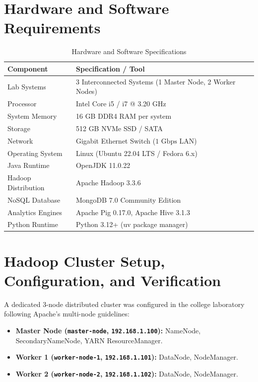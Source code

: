 \documentclass[12pt,a4paper]{article}
\begin{document}
\section{Hardware and Software Requirements}

\begin{table}[H]
\centering
\small
\begin{tabular}{ll}
\toprule
\textbf{Component} & \textbf{Specification / Tool} \\
\midrule
Lab Systems & 3 Interconnected Systems (1 Master Node, 2 Worker Nodes) \\
Processor & Intel Core i5 / i7 @ 3.20 GHz \\
System Memory & 16 GB DDR4 RAM per system \\
Storage & 512 GB NVMe SSD / SATA \\
Network & Gigabit Ethernet Switch ($1\text{ Gbps}$ LAN) \\
Operating System & Linux (Ubuntu 22.04 LTS / Fedora 6.x) \\
Java Runtime & OpenJDK 11.0.22 \\
Hadoop Distribution & Apache Hadoop 3.3.6 \\
NoSQL Database & MongoDB 7.0 Community Edition \\
Analytics Engines & Apache Pig 0.17.0, Apache Hive 3.1.3 \\
Python Runtime & Python 3.12+ (uv package manager) \\
\bottomrule
\end{tabular}
\caption{Hardware and Software Specifications}
\end{table}

\section{Hadoop Cluster Setup, Configuration, and Verification}

A dedicated 3-node distributed cluster was configured in the college laboratory following Apache's multi-node guidelines:
\begin{itemize}
    \item \textbf{Master Node (\texttt{master-node}, \texttt{192.168.1.100}):} NameNode, SecondaryNameNode, YARN ResourceManager.
    \item \textbf{Worker 1 (\texttt{worker-node-1}, \texttt{192.168.1.101}):} DataNode, NodeManager.
    \item \textbf{Worker 2 (\texttt{worker-node-2}, \texttt{192.168.1.102}):} DataNode, NodeManager.
\end{itemize}
\end{document}
